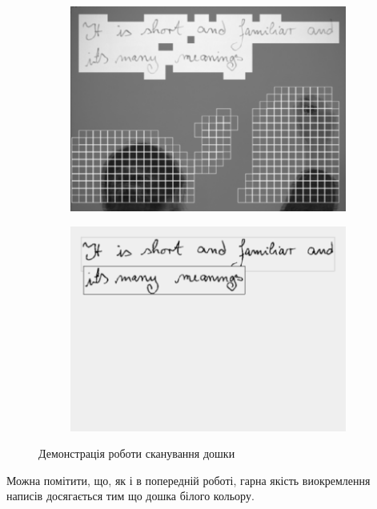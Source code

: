 \begin{figure}[H]
  \centering
  \begin{subfigure}[b]{0.35\textwidth}
    \centering
    \includegraphics[width=\textwidth]{images/wienecke_1}
  \end{subfigure}
  \begin{subfigure}[b]{0.35\textwidth}
    \centering
    \includegraphics[width=\textwidth]{images/wienecke_2}
  \end{subfigure}
  \caption{Демонстрація роботи сканування дошки \cite{wienecke}
    \label{fig:wienecke}
  }
\end{figure}

Можна помітити, що, як і в попередній роботі, гарна якість виокремлення написів
досягається тим що дошка білого кольору.

